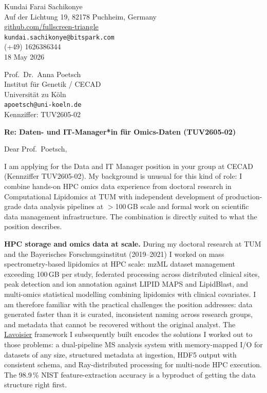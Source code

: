 \documentclass[12pt,a4paper]{article}
\begin{document}
\begin{flushright}
Kundai Farai Sachikonye \\
Auf der Lichtung 19, 82178 Puchheim, Germany \\
\href{https://github.com/fullscreen-triangle}{github.com/fullscreen-triangle} \\
\texttt{kundai.sachikonye@bitspark.com} \\
(+49) 1626386344 \\[6pt]
18 May 2026
\end{flushright}

\vspace{1em}

Prof.\ Dr.\ Anna Poetsch \\
Institut für Genetik / CECAD \\
Universität zu Köln \\
\texttt{apoetsch@uni-koeln.de} \\
Kennziffer: TUV2605-02

\vspace{1.5em}

\textbf{Re: Daten- und IT-Manager*in für Omics-Daten (TUV2605-02)}

\vspace{1em}

Dear Prof.\ Poetsch,

I am applying for the Data and IT Manager position in your group at CECAD
(Kennziffer TUV2605-02).
My background is unusual for this kind of role: I combine hands-on HPC omics
data experience from doctoral research in Computational Lipidomics at TUM
with independent development of production-grade data analysis pipelines
at $>$100\,GB scale and formal work on scientific data management infrastructure.
The combination is directly suited to what the position describes.

\textbf{HPC storage and omics data at scale.}
During my doctoral research at TUM and the Bayerisches Forschungsinstitut
(2019--2021) I worked on mass spectrometry-based lipidomics at HPC scale:
mzML dataset management exceeding 100\,GB per study, federated processing across
distributed clinical sites, peak detection and ion annotation against LIPID MAPS
and LipidBlast, and multi-omics statistical modelling combining lipidomics with
clinical covariates. I am therefore familiar with the practical challenges the
position addresses: data generated faster than it is curated, inconsistent naming
across research groups, and metadata that cannot be recovered without the original
analyst.
The \href{https://github.com/fullscreen-triangle/lavoisier}{Lavoisier} framework
I subsequently built encodes the solutions I worked out to those problems:
a dual-pipeline MS analysis system with memory-mapped I/O for datasets of any
size, structured metadata at ingestion, HDF5 output with consistent schema,
and Ray-distributed processing for multi-node HPC execution.
The 98.9\,\% NIST feature-extraction accuracy is a byproduct of getting the
data structure right first.
\end{document}
